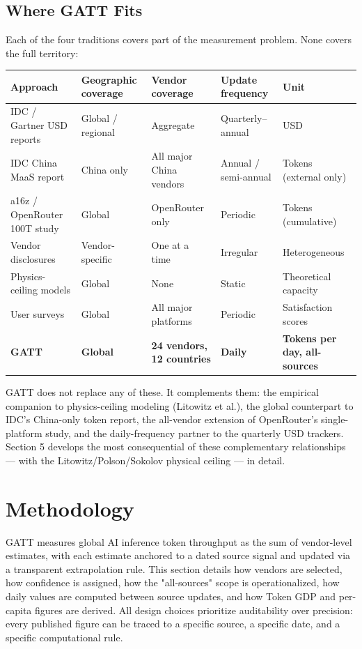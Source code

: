 \documentclass[11pt,a4paper]{article}
\begin{document}
\subsection{Where GATT Fits}

Each of the four traditions covers part of the measurement problem. None covers the full territory:

\begin{center}
\begin{tabular}{lllll}
\toprule
Approach & Geographic coverage & Vendor coverage & Update frequency & Unit \\
\midrule
IDC / Gartner USD reports & Global / regional & Aggregate & Quarterly–annual & USD \\
IDC China MaaS report & China only & All major China vendors & Annual / semi-annual & Tokens (external only) \\
a16z / OpenRouter 100T study & Global & OpenRouter only & Periodic & Tokens (cumulative) \\
Vendor disclosures & Vendor-specific & One at a time & Irregular & Heterogeneous \\
Physics-ceiling models & Global & None & Static & Theoretical capacity \\
User surveys & Global & All major platforms & Periodic & Satisfaction scores \\
\textbf{GATT} & \textbf{Global} & \textbf{24 vendors, 12 countries} & \textbf{Daily} & \textbf{Tokens per day, all-sources} \\
\bottomrule
\end{tabular}
\end{center}


GATT does not replace any of these. It complements them: the empirical companion to physics-ceiling modeling (Litowitz et al.), the global counterpart to IDC's China-only token report, the all-vendor extension of OpenRouter's single-platform study, and the daily-frequency partner to the quarterly USD trackers. Section 5 develops the most consequential of these complementary relationships --- with the Litowitz/Polson/Sokolov physical ceiling --- in detail.


\section{Methodology}

GATT measures global AI inference token throughput as the sum of vendor-level estimates, with each estimate anchored to a dated source signal and updated via a transparent extrapolation rule. This section details how vendors are selected, how confidence is assigned, how the "all-sources" scope is operationalized, how daily values are computed between source updates, and how Token GDP and per-capita figures are derived. All design choices prioritize auditability over precision: every published figure can be traced to a specific source, a specific date, and a specific computational rule.
\end{document}
